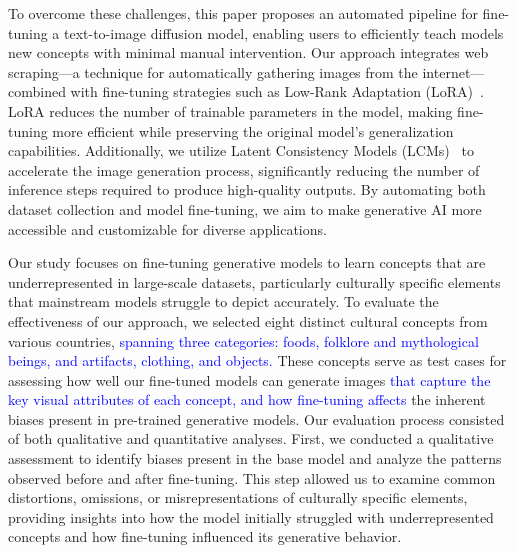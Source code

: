 \documentclass[pdflatex,sn-mathphys-num]{sn-jnl}%
\theoremstyle{thmstyleone}%
\theoremstyle{thmstyletwo}%
\theoremstyle{thmstylethree}%
\begin{document}
To overcome these challenges, this paper proposes an automated pipeline for fine-tuning a text-to-image diffusion model, enabling users to efficiently teach models new concepts with minimal manual intervention. Our approach integrates web scraping—a technique for automatically gathering images from the internet—combined with fine-tuning strategies such as Low-Rank Adaptation (LoRA)~\cite{hu2021loralowrankadaptationlarge}. LoRA reduces the number of trainable parameters in the model, making fine-tuning more efficient while preserving the original model's generalization capabilities. Additionally, we utilize Latent Consistency Models (LCMs)~\cite{luo2023latent} to accelerate the image generation process, significantly reducing the number of inference steps required to produce high-quality outputs. By automating both dataset collection and model fine-tuning, we aim to make generative AI more accessible and customizable for diverse applications.  

Our study focuses on fine-tuning generative models to learn concepts that are underrepresented in large-scale datasets, particularly culturally specific elements that mainstream models struggle to depict accurately. To evaluate the effectiveness of our approach, we selected eight distinct cultural concepts from various countries, \textcolor{blue}{spanning three categories: foods, folklore and mythological beings, and artifacts, clothing, and objects.} These concepts serve as test cases for assessing how well our fine-tuned models can generate images \textcolor{blue}{that capture the key visual attributes of each concept, and how fine-tuning affects} the inherent biases present in pre-trained generative models. Our evaluation process consisted of both qualitative and quantitative analyses. First, we conducted a qualitative assessment to identify biases present in the base model and analyze the patterns observed before and after fine-tuning. This step allowed us to examine common distortions, omissions, or misrepresentations of culturally specific elements, providing insights into how the model initially struggled with underrepresented concepts and how fine-tuning influenced its generative behavior.
\end{document}
